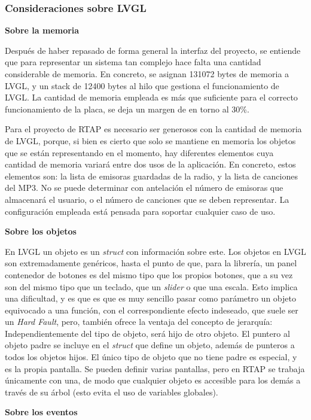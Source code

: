\subsubsection{Consideraciones sobre LVGL}
\textbf{Sobre la memoria}

Después de haber repasado de forma general la interfaz del proyecto, se entiende que para representar un sistema tan complejo hace falta una cantidad considerable de memoria. En concreto, se asignan 131072 bytes de memoria a LVGL, y un stack de 12400 bytes al hilo que gestiona el funcionamiento de LVGL. La cantidad de memoria empleada es más que suficiente para el correcto funcionamiento de la placa, se deja un margen de en torno al 30\%. 

Para el proyecto de RTAP es necesario ser generosos con la cantidad de memoria de LVGL, porque, si bien es cierto que solo se mantiene en memoria los objetos que se están representando en el momento, hay diferentes elementos cuya cantidad de memoria variará entre dos usos de la aplicación. En concreto, estos elementos son: la lista de emisoras guardadas de la radio, y la lista de canciones del MP3. No se puede determinar con antelación el número de emisoras que almacenará el usuario, o el número de canciones que se deben representar. La configuración empleada está pensada para soportar cualquier caso de uso.

\textbf{Sobre los objetos}

En LVGL un objeto es un \textit{struct} con información sobre este. Los objetos en LVGL son extremadamente genéricos, hasta el punto de que, para la librería, un panel contenedor de botones es del mismo tipo que los propios botones, que a su vez son del mismo tipo que un teclado, que un \textit{slider} o que una escala. Esto implica una dificultad, y es que es que es muy sencillo pasar como parámetro un objeto equivocado a una función, con el correspondiente efecto indeseado, que suele ser un \textit{Hard Fault}, pero, también ofrece la ventaja del concepto de jerarquía: Independientemente del tipo de objeto, será hijo de otro objeto. El puntero al objeto padre se incluye en el \textit{struct} que define un objeto, además de punteros a todos los objetos hijos. El único tipo de objeto que no tiene padre es especial, y es la propia pantalla. Se pueden definir varias pantallas, pero en RTAP se trabaja únicamente con una, de modo que cualquier objeto es accesible para los demás a través de su árbol (esto evita el uso de variables globales).

\textbf{Sobre los eventos}


